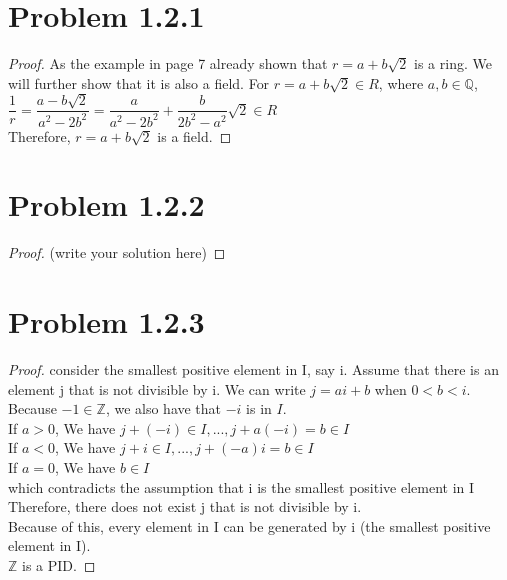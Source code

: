 \documentclass[12pt]{article}
\begin{document}
\newpage 

\section{Problem 1.2.1}

\begin{proof}
	As the example in page 7 already shown that $r=a+b \sqrt{2}$ is a ring. We will further show that it is also a field. For $r=a+b \sqrt{2} \in R$, where $a,b \in \mathbb{Q}$, $\dfrac{1}{r}=\dfrac{a-b \sqrt{2}}{a^2-2b^2}=\dfrac{a}{a^2-2b^2}+\dfrac{b }{2b^2-a^2}\sqrt{2}\in R$
 \\ Therefore, $r=a+b \sqrt{2}$ is a field.
\end{proof}

\newpage 

\section{Problem 1.2.2}

\begin{proof}
	(write your solution here)
\end{proof}

\newpage 

\section{Problem 1.2.3}

\begin{proof}
	consider the smallest positive element in I, say i. Assume that there is an element j that is not divisible by i. We can write $j = ai+b$ when $0<b<i$. Because $-1 \in \mathbb{Z}$, we also have that $-i$ is in $I$. 
 \\ If $a>0$, We have $j+(-i) \in I, ... ,j+a(-i)=b \in I$
 \\ If $a<0$, We have $j+i \in I, ... ,j+(-a)i=b \in I$
 \\ If $a=0$, We have $b \in I$
 \\which contradicts the assumption that i is the smallest positive element in I
 \\ Therefore, there does not exist j that is not divisible by i.
 \\ Because of this, every element in I can be generated by i (the smallest positive element in I).
 \\ $\mathbb{Z}$ is a PID.
\end{proof}

\newpage 
\end{document}
